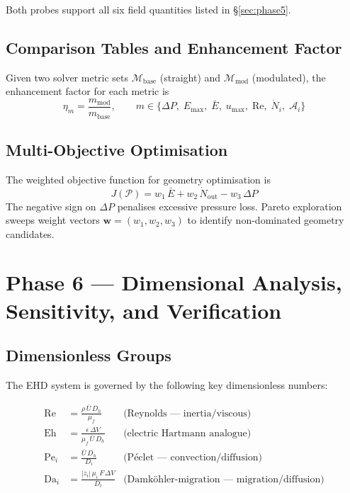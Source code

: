 \documentclass[11pt,a4paper]{article}
\begin{document}
Both probes support all six field quantities listed in \S\ref{sec:phase5}.

\subsection{Comparison Tables and Enhancement Factor}

Given two solver metric sets $\mathcal{M}_{\mathrm{base}}$ (straight) and
$\mathcal{M}_{\mathrm{mod}}$ (modulated), the enhancement factor for each
metric is
\begin{equation}\label{eq:eta}
  \eta_m = \frac{m_{\mathrm{mod}}}{m_{\mathrm{base}}},
  \qquad m \in \{\Delta P,\; E_{\max},\; \bar{E},\;
  u_{\max},\; \mathrm{Re},\; \dot{N}_{i},\; \mathcal{A}_i\}
\end{equation}

\subsection{Multi-Objective Optimisation}

The weighted objective function for geometry optimisation is
\begin{equation}\label{eq:objective}
  J(\mathcal{P}) = w_1\,\bar{E} + w_2\,\dot{N}_{\mathrm{out}} - w_3\,\Delta P
\end{equation}
The negative sign on $\Delta P$ penalises excessive pressure loss.  Pareto
exploration sweeps weight vectors $\bm{w} = (w_1, w_2, w_3)$ to identify
non-dominated geometry candidates.

\section{Phase 6 — Dimensional Analysis, Sensitivity, and Verification}
\label{sec:phase6}

\subsection{Dimensionless Groups}

The EHD system is governed by the following key dimensionless numbers:

\begin{align}
  \mathrm{Re}   &= \frac{\rho\,\bar{U}\,D_h}{\mu_f}
                  & \text{(Reynolds — inertia/viscous)}
                  \label{eq:Re_dim} \\[4pt]
  \mathrm{Eh}   &= \frac{\epsilon\,\Delta V}{\mu_f\,\bar{U}\,D_h}
                  & \text{(electric Hartmann analogue)}
                  \label{eq:Eh} \\[4pt]
  \mathrm{Pe}_i &= \frac{\bar{U}\,D_h}{D_i}
                  & \text{(Péclet — convection/diffusion)}
                  \label{eq:Pe} \\[4pt]
  \mathrm{Da}_i &= \frac{|z_i|\,\mu_i\,F\,\Delta V}{D_i}
                  & \text{(Damköhler-migration — migration/diffusion)}
                  \label{eq:Da}
\end{align}
\end{document}
